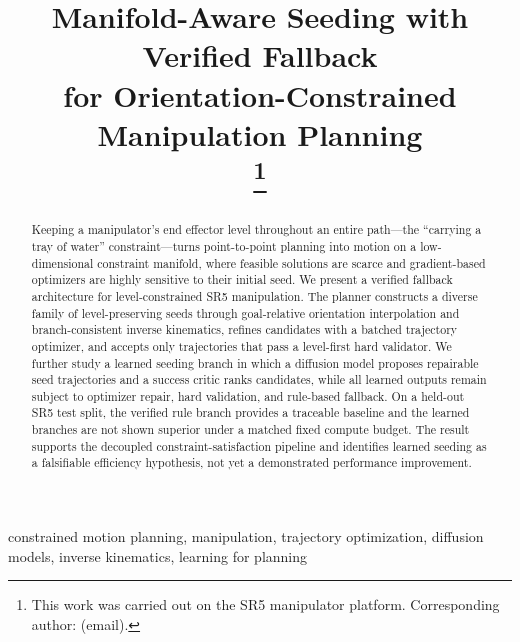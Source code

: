 \documentclass[conference]{IEEEtran/IEEEtran}
\begin{document}
\title{Manifold-Aware Seeding with Verified Fallback\\
for Orientation-Constrained Manipulation Planning\\
\thanks{This work was carried out on the SR5 manipulator platform.
Corresponding author: (email).}}

\author{
\and
{}
}

\maketitle

\begin{abstract}
Keeping a manipulator's end effector level throughout an entire path---the
``carrying a tray of water'' constraint---turns point-to-point planning into
motion on a low-dimensional constraint manifold, where feasible solutions are
scarce and gradient-based optimizers are highly sensitive to their initial
seed. We present a verified fallback architecture for level-constrained SR5
manipulation. The planner constructs a diverse family of level-preserving seeds
through goal-relative orientation interpolation and branch-consistent inverse
kinematics, refines candidates with a batched trajectory optimizer, and accepts
only trajectories that pass a level-first hard validator. We further study a
learned seeding branch in which a diffusion model proposes repairable seed
trajectories and a success critic ranks candidates, while all learned outputs
remain subject to optimizer repair, hard validation, and rule-based fallback.
On a held-out SR5 test split, the verified rule branch provides a traceable
baseline and the learned branches are not shown superior under a matched
fixed compute budget. The result supports the decoupled constraint-satisfaction
pipeline and identifies learned seeding as a falsifiable efficiency hypothesis,
not yet a demonstrated performance improvement.
\end{abstract}

\begin{IEEEkeywords}
constrained motion planning, manipulation, trajectory optimization, diffusion
models, inverse kinematics, learning for planning
\end{IEEEkeywords}
\end{document}
